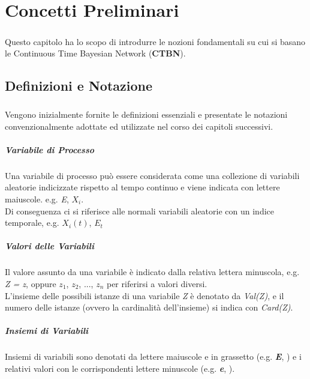 \chapter{Concetti Preliminari}
  \label{chapter_concetti_preliminari}
  \paragraph{}
  Questo capitolo ha lo scopo di introdurre le nozioni fondamentali su cui si
  basano le Continuous Time Bayesian Network (\textbf{CTBN}).

  \section{Definizioni e Notazione}
  \paragraph{}
  Vengono inizialmente fornite le definizioni essenziali e presentate le notazioni convenzionalmente 
  adottate ed utilizzate nel corso dei capitoli successivi.

  \paragraph{Variabile di Processo} \cite{nodelman-2007}
  Una variabile di processo può essere considerata come una collezione di variabili aleatorie
  indicizzate rispetto al tempo continuo e viene indicata con lettere maiuscole.
  e.g. \textit{E}, \textit{$X_i$}.\\    
  Di conseguenza ci si riferisce alle normali variabili aleatorie con un indice temporale,
  e.g. \textit{$X_{i}(t)$}, \textit{$E_t$}

  \paragraph{Valori delle Variabili}
  Il valore assunto da una variabile è indicato dalla relativa lettera minuscola, e.g. \textit{Z = z}, oppure
  $z_1$, $z_2$, ..., $z_n$ per riferirsi a valori diversi.\\
  L'insieme delle possibili istanze di una variabile \textit{Z} è denotato da \textit{Val(Z)},
  e il numero delle istanze (ovvero la cardinalità dell'insieme) si indica con \textit{Card(Z)}.

  \paragraph{Insiemi di Variabili}
  Insiemi di variabili sono denotati da lettere maiuscole e in grassetto (e.g. \textit{\textbf{E}},
  ) e i relativi valori con le corrispondenti lettere minuscole (e.g. \textit{\textbf{e}},
  ).

